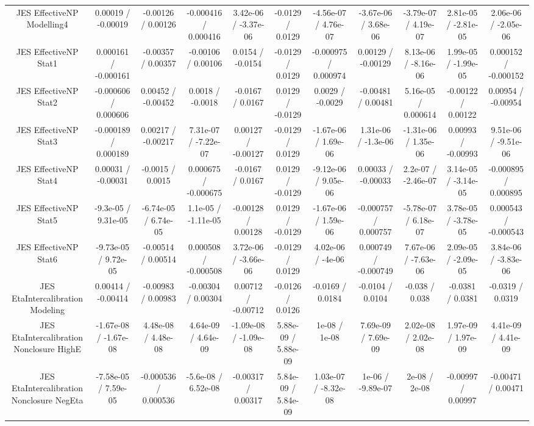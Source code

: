 \begin{table}[htbp]
\begin{center}
\begin{tabular}{|c|c|c|c|c|c|c|c|c|c|c|}
  JES EffectiveNP Modelling4 & 0.00019 / -0.00019 & -0.00126 / 0.00126 & -0.000416 / 0.000416 & 3.42e-06 / -3.37e-06 & -0.0129 / 0.0129 & -4.56e-07 / 4.76e-07 & -3.67e-06 / 3.68e-06 & -3.79e-07 / 4.19e-07 & 2.81e-05 / -2.81e-05 & 2.06e-06 / -2.05e-06 \\ 
  JES EffectiveNP Stat1 & 0.000161 / -0.000161 & -0.00357 / 0.00357 & -0.00106 / 0.00106 & 0.0154 / -0.0154 & -0.0129 / 0.0129 & -0.000975 / 0.000974 & 0.00129 / -0.00129 & 8.13e-06 / -8.16e-06 & 1.99e-05 / -1.99e-05 & 0.000152 / -0.000152 \\ 
  JES EffectiveNP Stat2 & -0.000606 / 0.000606 & 0.00452 / -0.00452 & 0.0018 / -0.0018 & -0.0167 / 0.0167 & 0.0129 / -0.0129 & 0.0029 / -0.0029 & -0.00481 / 0.00481 & 5.16e-05 / 0.000614 & -0.00122 / 0.00122 & 0.00954 / -0.00954 \\ 
  JES EffectiveNP Stat3 & -0.000189 / 0.000189 & 0.00217 / -0.00217 & 7.31e-07 / -7.22e-07 & 0.00127 / -0.00127 & -0.0129 / 0.0129 & -1.67e-06 / 1.69e-06 & 1.31e-06 / -1.3e-06 & -1.31e-06 / 1.35e-06 & 0.00993 / -0.00993 & 9.51e-06 / -9.51e-06 \\ 
  JES EffectiveNP Stat4 & 0.00031 / -0.00031 & -0.0015 / 0.0015 & 0.000675 / -0.000675 & -0.0167 / 0.0167 & 0.0129 / -0.0129 & -9.12e-06 / 9.05e-06 & 0.00033 / -0.00033 & 2.2e-07 / -2.46e-07 & 3.14e-05 / -3.14e-05 & -0.000895 / 0.000895 \\ 
  JES EffectiveNP Stat5 & -9.3e-05 / 9.31e-05 & -6.74e-05 / 6.74e-05 & 1.1e-05 / -1.11e-05 & -0.00128 / 0.00128 & 0.0129 / -0.0129 & -1.67e-06 / 1.59e-06 & -0.000757 / 0.000757 & -5.78e-07 / 6.18e-07 & 3.78e-05 / -3.78e-05 & 0.000543 / -0.000543 \\ 
  JES EffectiveNP Stat6 & -9.73e-05 / 9.72e-05 & -0.00514 / 0.00514 & 0.000508 / -0.000508 & 3.72e-06 / -3.66e-06 & -0.0129 / 0.0129 & 4.02e-06 / -4e-06 & 0.000749 / -0.000749 & 7.67e-06 / -7.63e-06 & 2.09e-05 / -2.09e-05 & 3.84e-06 / -3.83e-06 \\ 
  JES EtaIntercalibration Modeling & 0.00414 / -0.00414 & -0.00983 / 0.00983 & -0.00304 / 0.00304 & 0.00712 / -0.00712 & -0.0126 / 0.0126 & -0.0169 / 0.0184 & -0.0104 / 0.0104 & -0.038 / 0.038 & -0.0381 / 0.0381 & -0.0319 / 0.0319 \\ 
  JES EtaIntercalibration Nonclosure HighE & -1.67e-08 / -1.67e-08 & 4.48e-08 / 4.48e-08 & 4.64e-09 / 4.64e-09 & -1.09e-08 / -1.09e-08 & 5.88e-09 / 5.88e-09 & 1e-08 / 1e-08 & 7.69e-09 / 7.69e-09 & 2.02e-08 / 2.02e-08 & 1.97e-09 / 1.97e-09 & 4.41e-09 / 4.41e-09 \\ 
  JES EtaIntercalibration Nonclosure NegEta & -7.58e-05 / 7.59e-05 & -0.000536 / 0.000536 & -5.6e-08 / 6.52e-08 & -0.00317 / 0.00317 & 5.84e-09 / 5.84e-09 & 1.03e-07 / -8.32e-08 & 1e-06 / -9.89e-07 & 2e-08 / 2e-08 & -0.00997 / 0.00997 & -0.00471 / 0.00471 \\ 

\end{tabular}
\end{center}
\end{table}
